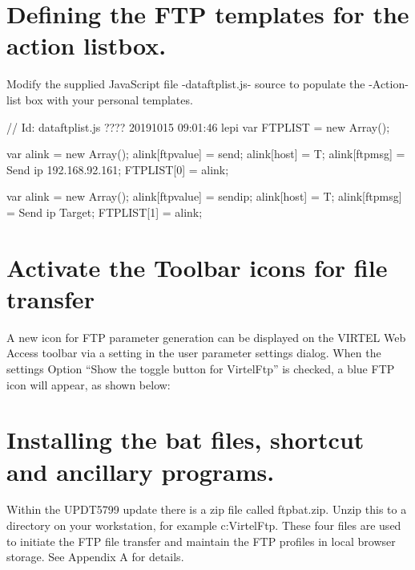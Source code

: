 \documentclass[letterpaper,10pt,english]{sphinxmanual}
\begin{document}
\begin{sphinxVerbatim}[commandchars=\\\{\}]
          
\end{sphinxVerbatim}


\section{Defining the FTP templates for the action listbox.}
\label{\detokenize{TN201905:defining-the-ftp-templates-for-the-action-listbox}}
Modify the supplied JavaScript file -dataftplist.js- source to populate the -Action- list box with your personal templates.

\begin{sphinxVerbatim}[commandchars=\\\{\}]
// \PYGZdl{}Id: dataftplist.js ???? 2019\PYGZhy{}10\PYGZhy{}15 09:01:46 lepi \PYGZdl{}
var FTPLIST = new Array();

var alink = new Array();
alink[\PYGZdq{}ftpvalue\PYGZdq{}] = \PYGZdq{}send\PYGZdq{};
alink[\PYGZdq{}host\PYGZdq{}] = \PYGZdq{}T\PYGZdq{};
alink[\PYGZdq{}ftpmsg\PYGZdq{}] = \PYGZdq{}Send ip 192.168.92.161\PYGZdq{};
FTPLIST[0] = alink;

var alink = new Array();
alink[\PYGZdq{}ftpvalue\PYGZdq{}] = \PYGZdq{}sendip\PYGZdq{};
alink[\PYGZdq{}host\PYGZdq{}] = \PYGZdq{}T\PYGZdq{};
alink[\PYGZdq{}ftpmsg\PYGZdq{}] = \PYGZdq{}Send ip Target\PYGZdq{};
FTPLIST[1] = alink;
\end{sphinxVerbatim}


\section{Activate the Toolbar icons for file transfer}
\label{\detokenize{TN201905:activate-the-toolbar-icons-for-file-transfer}}
A new icon for FTP parameter generation can be displayed on the VIRTEL Web Access toolbar via a setting in the user parameter settings dialog. When the settings Option “Show the toggle button for VirtelFtp” is checked, a blue FTP icon will appear, as shown below:



\section{Installing the bat files, shortcut and ancillary programs.}
\label{\detokenize{TN201905:installing-the-bat-files-shortcut-and-ancillary-programs}}
Within the UPDT5799 update there is a zip file called ftpbat.zip. Unzip this to a directory on your workstation, for example c:VirtelFtp. These four files are used to initiate the FTP file transfer and maintain the FTP profiles in local browser storage. See Appendix A for details.
\end{document}

